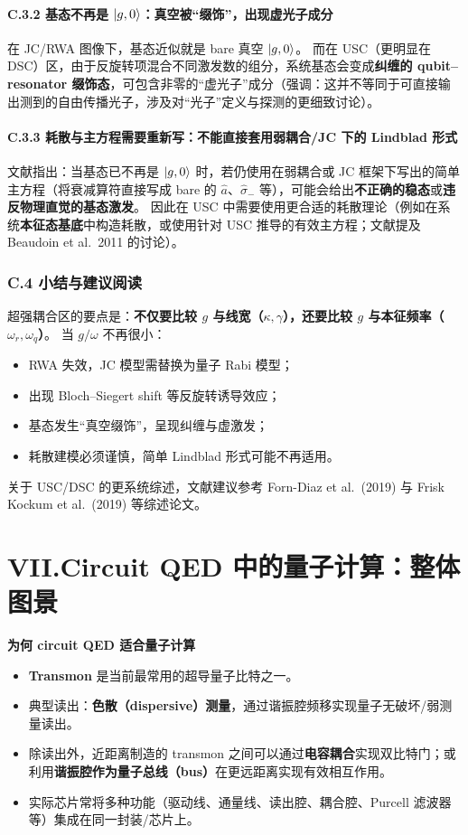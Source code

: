 \documentclass[12pt,a4paper,oneside]{ctexbook}
\let\oldparagraph\paragraph
\renewcommand{\paragraph}[1]{\oldparagraph{#1}\mbox{}}
\begin{document}
\paragraph{C.3.2 基态不再是 $\ket{g,0}$：真空被“缀饰”，出现虚光子成分}
在 JC/RWA 图像下，基态近似就是 bare 真空 $\ket{g,0}$。
而在 USC（更明显在 DSC）区，由于反旋转项混合不同激发数的组分，系统基态会变成\textbf{纠缠的 qubit--resonator 缀饰态}，可包含非零的“虚光子”成分（强调：这并不等同于可直接输出测到的自由传播光子，涉及对“光子”定义与探测的更细致讨论）。

\paragraph{C.3.3 耗散与主方程需要重新写：不能直接套用弱耦合/JC 下的 Lindblad 形式}
文献指出：当基态已不再是 $\ket{g,0}$ 时，若仍使用在弱耦合或 JC 框架下写出的简单主方程（将衰减算符直接写成 bare 的 $\hat a$、$\hat\sigma_-$ 等），可能会给出\textbf{不正确的稳态}或\textbf{违反物理直觉的基态激发}。
因此在 USC 中需要使用更合适的耗散理论（例如在系统\textbf{本征态基底}中构造耗散，或使用针对 USC 推导的有效主方程；文献提及 Beaudoin et al.\ 2011 的讨论）。

\subsubsection{C.4 小结与建议阅读}
超强耦合区的要点是：\textbf{不仅要比较 $g$ 与线宽（$\kappa,\gamma$），还要比较 $g$ 与本征频率（$\omega_r,\omega_q$）}。
当 $g/\omega$ 不再很小：
\begin{itemize}
  \item RWA 失效，JC 模型需替换为量子 Rabi 模型；
  \item 出现 Bloch--Siegert shift 等反旋转诱导效应；
  \item 基态发生“真空缀饰”，呈现纠缠与虚激发；
  \item 耗散建模必须谨慎，简单 Lindblad 形式可能不再适用。
\end{itemize}
关于 USC/DSC 的更系统综述，文献建议参考 Forn-Diaz et al.\ (2019) 与 Frisk Kockum et al.\ (2019) 等综述论文。


\section{VII.\quad Circuit QED 中的量子计算：整体图景}

\noindent\textbf{为何 circuit QED 适合量子计算}

\begin{itemize}
  \item \textbf{Transmon} 是当前最常用的超导量子比特之一。
  \item 典型读出：\textbf{色散（dispersive）测量}，通过谐振腔频移实现量子无破坏/弱测量读出。
  \item 除读出外，近距离制造的 transmon 之间可以通过\textbf{电容耦合}实现双比特门；或利用\textbf{谐振腔作为量子总线（bus）}在更远距离实现有效相互作用。
  \item 实际芯片常将多种功能（驱动线、通量线、读出腔、耦合腔、Purcell 滤波器等）集成在同一封装/芯片上。
\end{itemize}
\end{document}
